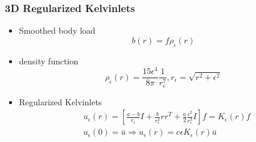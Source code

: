 \documentclass[serif,mathserif, 12pt]{beamer}
\begin{document}
\begin{frame}
  \frametitle{3D Regularized Kelvinlets}
  \begin{itemize}
  \item Smoothed body load
    \begin{equation*}
      b(r) = f\rho_\epsilon (r)
    \end{equation*}
  \item density function
    \begin{equation*}
      \rho_\epsilon(r) = \frac{15\epsilon^4}{8\pi}\frac{1}{r_\epsilon^7}, r_\epsilon = \sqrt{r^2+\epsilon^2}
    \end{equation*}
  \item Regularized Kelvinlets
    \begin{equation*}
      \begin{split}
      &u_\epsilon(r) = \left[\frac{a-b}{r_\epsilon}I+\frac{b}{r_\epsilon^3}rr^T+\frac{a}{2}
        \frac{\epsilon^2}{r_\epsilon^3}I\right]f = K_\epsilon(r)f \\
      &u_\epsilon(0) = \bar u \Rightarrow u_\epsilon(r) = c\epsilon K_\epsilon(r) \bar u
      \end{split}
    \end{equation*}
  \end{itemize}
\end{frame}
\end{document}
